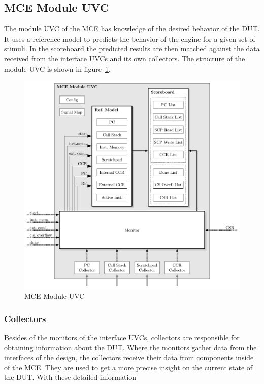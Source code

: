\subsection{MCE Module UVC}

The module UVC of the MCE has knowledge of the desired behavior of the DUT.
It uses a reference model to predicts the behavior of the engine for a given set of stimuli.
In the scoreboard the predicted results are then matched against the data received from the interface UVCs and its own collectors.
The structure of the module UVC is shown in figure~\ref{fig:module_uvc}.

\begin{figure}[htb]
 \centering
 \includegraphics[width=1.0\textwidth,angle=0]{images/mce_module_uvc}
 \caption{MCE Module UVC}
\label{fig:module_uvc}
\end{figure}

\subsubsection{Collectors}

Besides of the monitors of the interface UVCs, collectors are responsible for obtaining information about the DUT.
Where the monitors gather data from the interfaces of the design, the collectors receive their data from components inside of the MCE.
They are used to get a more precise insight on the current state of the DUT.
With these detailed information 
 

